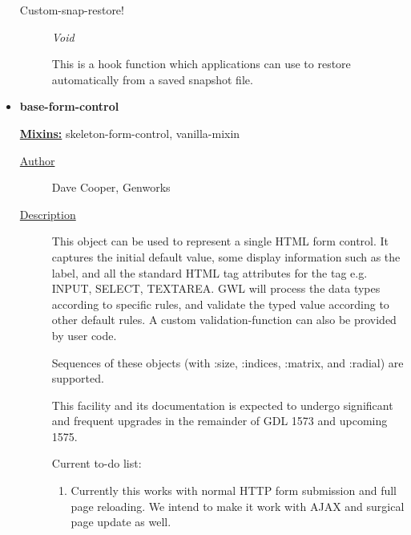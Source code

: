 \documentclass [11pt]{book}
\begin{document}
\begin{itemize}
\begin{description}

\item [Custom-snap-restore!]
\emph{Void}

 This is a hook function which applications can use to restore automatically
from a saved snapshot file.




\end{description}







\item {}
\label{prim:base-form-control}
\textbf{base-form-control}


\textbf{
\underline{Mixins:}} skeleton-form-control, vanilla-mixin





\begin{description}

\item [
\underline{Author}]


Dave Cooper, Genworks



\item [
\underline{Description}]


This object can be used to represent a single HTML form control. It captures the 
initial default value, some display information such as the label, and all the standard HTML tag attributes
for the tag e.g. INPUT, SELECT, TEXTAREA. GWL will process the data types according to specific rules,
and validate the typed value according to other default rules. A custom validation-function can also 
be provided by user code. 

Sequences of these objects (with :size, :indices, :matrix, and :radial) are supported.

This facility and its documentation is expected to undergo significant and frequent upgrades in the remainder of GDL 1573 and upcoming 1575.

Current to-do list:



\begin{enumerate}

\item 
Currently this works with normal HTTP form submission and full page reloading. 
We intend to make it work with AJAX and surgical page update as well.




\end{enumerate}
\end{description}
\end{itemize}
\end{document}
